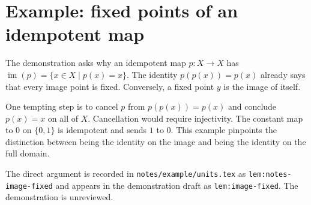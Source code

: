 \section{Example: fixed points of an idempotent map}

The demonstration asks why an idempotent map $p\colon X\to X$ has
$\operatorname{im}(p)=\{x\in X\mid p(x)=x\}$.
The identity $p(p(x))=p(x)$ already says that every image point is fixed.
Conversely, a fixed point $y$ is the image of itself.

One tempting step is to cancel $p$ from $p(p(x))=p(x)$ and conclude
$p(x)=x$ on all of $X$.
Cancellation would require injectivity. The constant map to $0$ on
$\{0,1\}$ is idempotent and sends $1$ to $0$.
This example pinpoints the distinction between being the identity on
the image and being the identity on the full domain.

The direct argument is recorded in \texttt{notes/example/units.tex}
as \texttt{lem:notes-image-fixed} and appears in the demonstration
draft as \texttt{lem:image-fixed}. The demonstration is unreviewed.
